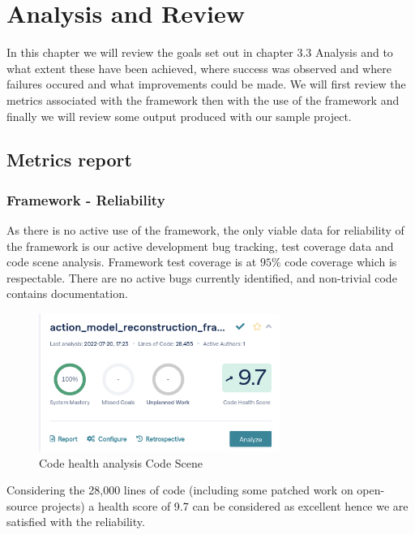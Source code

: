 \chapter{Analysis and Review}
In this chapter we will review the goals set out in chapter 3.3 Analysis and to what extent these have been achieved, where success was observed and where failures occured and what improvements could be made.
We will first review the metrics associated with the framework then with the use of the framework and finally we will review some output produced with our sample project.
\section{Metrics report}
\subsection{Framework - Reliability}
As there is no active use of the framework, the only viable data for reliability of the framework is our active development bug tracking, test coverage data and code scene analysis.
Framework test coverage is at \(95\%\) code coverage which is respectable.
There are no active bugs currently identified, and non-trivial code contains documentation.
\begin{figure}[h]
 \centering
 \includegraphics[width=0.7\textwidth]{images/code/Selection_062}
 \caption{Code health analysis Code Scene}
 \label{fig:code-health}
\end{figure}
Considering the 28,000 lines of code (including some patched work on open-source projects) a health score of 9.7 can be considered as excellent hence we are satisfied with the reliability.
\newpage
